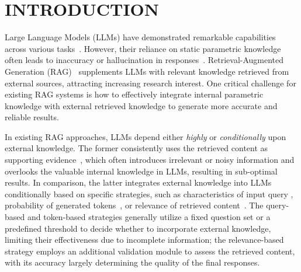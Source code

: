 
\section{INTRODUCTION}
Large Language Models (LLMs) have demonstrated remarkable capabilities across various tasks~\cite{Brown2020Few-Shot,Touvron2023LLaMA,openai2024gpt4}.
However, their reliance on static parametric knowledge~\cite{Kasai2023RealTimeQA, mallen2023trust} often leads to inaccuracy or hallucination in responses~\cite{Welleck2020Neural, min2023factscore}.
Retrieval-Augmented Generation (RAG)~\cite{Lewis2020RAG,Guu2020REALM,ram2023context,asai2023retrieval} supplements LLMs with relevant knowledge retrieved from external sources, attracting increasing research interest.
One critical challenge for existing RAG systems is how to effectively integrate internal parametric knowledge with external retrieved knowledge to generate more accurate and reliable results.


In existing RAG approaches, LLMs depend either \emph{highly} or \emph{conditionally} upon external knowledge.
The former consistently uses the retrieved content as supporting evidence~\cite{Lewis2020RAG, Guu2020REALM, trivedi2023interleaving}, which often introduces irrelevant or noisy information and overlooks the valuable internal knowledge in LLMs, resulting in sub-optimal results.
In comparison, the latter integrates external knowledge into LLMs conditionally based on specific strategies, such as characteristics of input query \cite{mallen2023trust, jeong2024adaptive, wang2023skr}, probability of generated tokens~\cite{jiang2023active, su2024dragin}, or relevance of retrieved content~\cite{zhang2023merging, Xu2024Search, liu2024raisf}.
The query-based and token-based strategies generally utilize a fixed question set or a predefined threshold to decide whether to incorporate external knowledge, limiting their effectiveness due to incomplete information; 
the relevance-based strategy employs an additional validation module to assess the retrieved content, with its accuracy largely determining the quality of the final responses.
 

